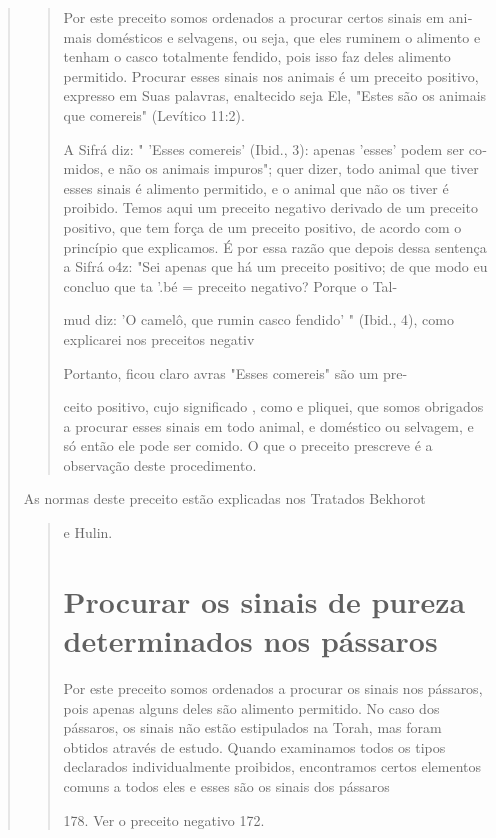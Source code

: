 \begin{quote}
\begin{quote}
Por este preceito somos ordenados a procurar certos sinais em ani­mais
domésticos e selvagens, ou seja, que eles ruminem o alimento e tenham o
casco totalmente fendido, pois isso faz deles alimento permitido.
Procurar esses sinais nos animais é um preceito positivo, expresso em
Suas palavras, enal­tecido seja Ele, "Estes são os animais que comereis"
(Levítico 11:2).

A Sifrá diz: " 'Esses comereis' (Ibid., 3): apenas 'esses' podem ser
co­midos, e não os animais impuros"; quer dizer, todo animal que tiver
esses si­nais é alimento permitido, e o animal que não os tiver é
proibido. Temos aqui um preceito negativo derivado de um preceito
positivo, que tem força de um preceito positivo, de acordo com o
princípio que explicamos. É por essa razão que depois dessa sentença a
Sifrá o4z: "Sei apenas que há um preceito positivo; de que modo eu
concluo que ta '.bé = preceito negativo? Porque o Tal-

mud diz: 'O camelô, que rumin casco fendido' " (Ibid., 4), como\\
explicarei nos preceitos negativ

Portanto, ficou claro avras "Esses comereis" são um pre-

ceito positivo, cujo significado , como e pliquei, que somos obrigados a
pro­curar esses sinais em todo animal, e doméstico ou selvagem, e só
então ele pode ser comido. O que o preceito prescreve é a observação
deste pro­cedimento.
\end{quote}

As normas deste preceito estão explicadas nos Tratados Bekhorot

\begin{quote}
e Hulin.

\section{Procurar os sinais de pureza determinados nos pássaros}

Por este preceito somos ordenados a procurar os sinais nos pássa­ros,
pois apenas alguns deles são alimento permitido. No caso dos pássaros,
os sinais não estão estipulados na Torah, mas foram obtidos através de
estudo. Quan­do examinamos todos os tipos declarados individualmente
proibidos, encon­tramos certos elementos comuns a todos eles e esses são
os sinais dos pássaros

178. Ver o preceito negativo 172.
\end{quote}


\end{quote}
